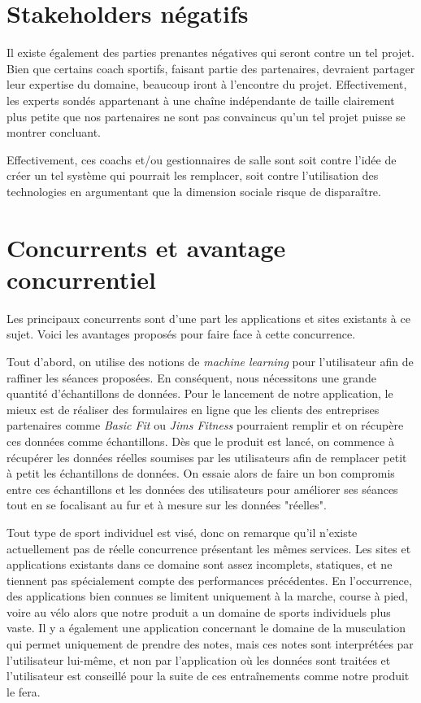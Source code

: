 \section{Stakeholders négatifs}

Il existe également des parties prenantes négatives qui seront contre un tel projet. Bien que certains coach sportifs, faisant partie des partenaires, devraient partager leur expertise du domaine, beaucoup iront à l'encontre du projet. Effectivement, les experts sondés appartenant à une chaîne indépendante de taille clairement plus petite que nos partenaires ne sont pas convaincus qu'un tel projet puisse se montrer concluant. 

Effectivement, ces coachs et/ou gestionnaires de salle sont soit contre l'idée de créer un tel système qui pourrait les remplacer, soit contre l'utilisation des technologies en argumentant que la dimension sociale risque de disparaître. 

\section{Concurrents et avantage concurrentiel}

Les principaux concurrents sont d'une part les applications et sites existants à ce sujet. Voici les avantages proposés pour faire face à cette concurrence.

Tout d'abord, on utilise des notions de \textit{machine learning} pour l'utilisateur afin de raffiner les séances proposées. En conséquent,  nous nécessitons une grande quantité d'échantillons de données. Pour le lancement de notre application, le mieux est de réaliser des formulaires en ligne que les clients des entreprises partenaires comme \textit{Basic Fit} ou \textit{Jims Fitness} pourraient remplir et on récupère ces données comme échantillons. Dès que le produit est lancé, on commence à récupérer les données réelles soumises par les utilisateurs afin de remplacer petit à petit les échantillons de données. On essaie alors de faire un bon compromis entre ces échantillons et les données des utilisateurs pour améliorer ses séances tout en se focalisant au fur et à mesure sur les données "réelles".

Tout type de sport individuel est visé, donc on remarque qu'il n'existe actuellement pas de réelle concurrence présentant les mêmes services. Les sites et applications existants dans ce domaine sont assez incomplets, statiques, et ne tiennent pas spécialement compte des performances précédentes. En l'occurrence, des applications bien connues se limitent uniquement à la marche, course à pied, voire au vélo alors que notre produit a un domaine de sports individuels plus vaste. Il y a également une application concernant le domaine de la musculation qui permet uniquement de prendre des notes, mais ces notes sont interprétées par l'utilisateur lui-même, et non par l'application où les données sont traitées et l'utilisateur est conseillé pour la suite de ces entraînements comme notre produit le fera.

